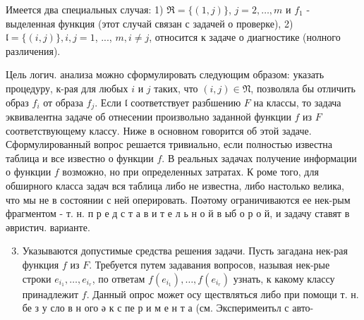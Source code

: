 \documentclass[10pt]{article}
\begin{document}
Имеется два специальных случая: 1) $\mathfrak{R}=\{(1, j)\}$, $j=2, \ldots, m$ и $f_{1}$ - выделенная функция (этот случай связан с задачей о проверке), 2) $\mathfrak{l}=\{(i, j)\}, i, j=1$, ..., $m, i \neq j$, относится к задаче о диагностике (нолного различения).



Цель логич. анализа можно сформулировать следующим образом: указать процедуру, к-рая для любых $i$ и $j$ таких, что $(i, j) \in \mathfrak{N}$, позволяла бы отличить образ $f_{i}$ от образа $f_{j}$. Если $\mathfrak{l}$ соответствует разбшению $F$ на классы, то задача эквивалентна задаче об отнесении произвольно заданной функции $f$ из $F$ соответствующему классу. Ниже в основном говорится об этой задаче. Сформулированный вопрос решается тривиально, если полностью известна таблица и все известно о функции $f$. В реальных задачах получение информации о функции $f$ возможно, но при определенных затратах. К роме того, для обширного класса задач вся таблица либо не известна, либо настолько велика, что мы не в состоянии с ней оперировать. Поәтому ограничиваются ее нек-рым фрагментом - т. н. п р е д с т а в и т е л ь н о й в ыб о р о й, и задачу ставят в әвристич. варианте.



\begin{enumerate}

  \setcounter{enumi}{2}

  \item Указываются допустимые средства решения задачи. Пусть загадана нек-рая функция $f$ из $F$. Требуется путем задавания вопросов, называя нек-рые строки $e_{i_{1}}, \ldots, e_{i_{r}}$, по ответам $f\left(e_{i_{1}}\right), \ldots, f\left(e_{i_{r}}\right)$ узнать, к какому классу принадлежит $f$. Данный опрос может осу ществляться либо при помощи т. н. бе з у сло в н ого ә к с пе р и м е н т а (см. Эксперимеитьл с авто-

\end{enumerate}
\end{document}
